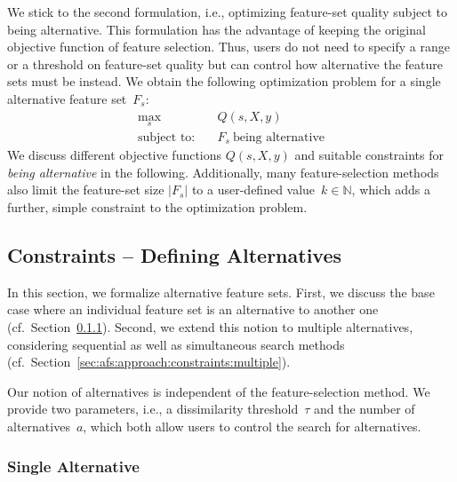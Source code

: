 \documentclass{article}
\theoremstyle{definition}
\begin{document}
We stick to the second formulation, i.e., optimizing feature-set quality subject to being alternative.
This formulation has the advantage of keeping the original objective function of feature selection.
Thus, users do not need to specify a range or a threshold on feature-set quality but can control how alternative the feature sets must be instead.
We obtain the following optimization problem for a single alternative feature set~$F_s$:
%
\begin{equation}
	\begin{aligned}
		\max_s &\quad Q(s,X,y) \\
		\text{subject to:} &\quad F_s~\text{being alternative}
	\end{aligned}
	\label{eq:afs:afs-general}
\end{equation}
%
We discuss different objective functions $Q(s,X,y)$ and suitable constraints for \emph{being alternative} in the following.
Additionally, many feature-selection methods also limit the feature-set size $|F_s|$ to a user-defined value~$k \in \mathbb{N}$, which adds a further, simple constraint to the optimization problem.

\subsection{Constraints -- Defining Alternatives}
\label{sec:afs:approach:constraints}

In this section, we formalize alternative feature sets.
First, we discuss the base case where an individual feature set is an alternative to another one (cf.~Section~\ref{sec:afs:approach:constraints:single}).
Second, we extend this notion to multiple alternatives, considering sequential as well as simultaneous search methods (cf.~Section~\ref{sec:afs:approach:constraints:multiple}).

Our notion of alternatives is independent of the feature-selection method.
We provide two parameters, i.e., a dissimilarity threshold~$\tau$ and the number of alternatives~$a$, which both allow users to control the search for alternatives.

\subsubsection{Single Alternative}
\label{sec:afs:approach:constraints:single}
\end{document}
